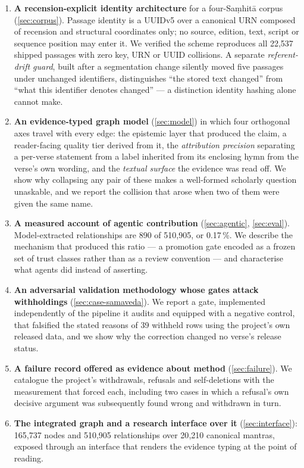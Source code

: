 \begin{enumerate}[leftmargin=1.9em,itemsep=3pt,topsep=3pt]
\item \textbf{A recension-explicit identity architecture} for a four-Sa\d{m}hit\=a
corpus (\cref{sec:corpus}). Passage identity is a \mbox{UUIDv5} over a canonical
\mbox{URN} composed of recension and structural coordinates only; no source, edition,
text, script or sequence position may enter it. We verified the scheme reproduces all
22{,}537 shipped passages with zero key, \mbox{URN} or \mbox{UUID} collisions. A
separate \emph{referent-drift guard}, built after a segmentation change silently moved
five passages under unchanged identifiers, distinguishes ``the stored text changed''
from ``what this identifier denotes changed'' --- a distinction identity hashing alone
cannot make.

\item \textbf{An evidence-typed graph model} (\cref{sec:model}) in which four
orthogonal axes travel with every edge: the epistemic layer that produced the claim,
a reader-facing quality tier derived from it, the \emph{attribution precision}
separating a per-verse statement from a label inherited from its enclosing hymn from
the verse's own wording, and the \emph{textual surface} the evidence was read off.
We show why collapsing any pair of these makes a well-formed scholarly question
unaskable, and we report the collision that arose when two of them were given the
same name.

\item \textbf{A measured account of agentic contribution} (\cref{sec:agentic},
\cref{sec:eval}). Model-extracted relationships are 890 of 510{,}905, or 0.17\,\%.
We describe the mechanism that produced this ratio --- a promotion gate encoded as a
frozen set of trust classes rather than as a review convention --- and characterise
what agents did instead of asserting.

\item \textbf{An adversarial validation methodology whose gates attack withholdings}
(\cref{sec:case-samaveda}). We report a gate, implemented independently of the
pipeline it audits and equipped with a negative control, that falsified the stated
reasons of 39 withheld rows using the project's own released data, and we show why
the correction changed no verse's release status.

\item \textbf{A failure record offered as evidence about method}
(\cref{sec:failure}). We catalogue the project's withdrawals, refusals and
self-deletions with the measurement that forced each, including two cases in which a
refusal's own decisive argument was subsequently found wrong and withdrawn in turn.

\item \textbf{The integrated graph and a research interface over it}
(\cref{sec:interface}): 165{,}737 nodes and 510{,}905 relationships over 20{,}210
canonical mantras, exposed through an interface that renders the evidence typing at
the point of reading.
\end{enumerate}


